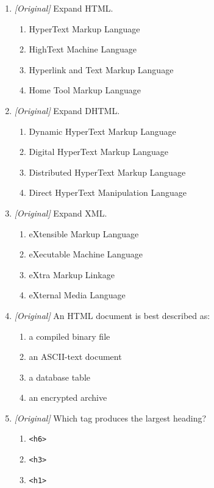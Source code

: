 \begin{enumerate}[label=\textbf{Q\arabic*.}, leftmargin=*]
\item \textit{[Original]} Expand HTML.
  \begin{enumerate}[label=\Alph*.]
    \item HyperText Markup Language
    \item HighText Machine Language
    \item Hyperlink and Text Markup Language
    \item Home Tool Markup Language
  \end{enumerate}
\item \textit{[Original]} Expand DHTML.
  \begin{enumerate}[label=\Alph*.]
    \item Dynamic HyperText Markup Language
    \item Digital HyperText Markup Language
    \item Distributed HyperText Markup Language
    \item Direct HyperText Manipulation Language
  \end{enumerate}
\item \textit{[Original]} Expand XML.
  \begin{enumerate}[label=\Alph*.]
    \item eXtensible Markup Language
    \item eXecutable Machine Language
    \item eXtra Markup Linkage
    \item eXternal Media Language
  \end{enumerate}
\item \textit{[Original]} An HTML document is best described as:
  \begin{enumerate}[label=\Alph*.]
    \item a compiled binary file
    \item an ASCII-text document
    \item a database table
    \item an encrypted archive
  \end{enumerate}
\item \textit{[Original]} Which tag produces the largest heading?
  \begin{enumerate}[label=\Alph*.]
    \item \texttt{<h6>}
    \item \texttt{<h3>}
    \item \texttt{<h1>}

\end{enumerate}
\end{enumerate}

